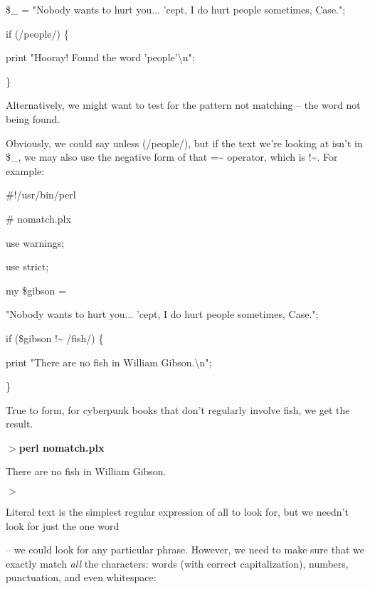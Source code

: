 \documentclass[a4paper,11pt]{book}
\begin{document}
\noindent 

\noindent \$\_  = "Nobody wants to hurt you... 'cept, I do hurt people sometimes, Case.";

\noindent if (/people/) \{

\noindent print "Hooray! Found the word 'people'\textbackslash n";

\noindent \}

\noindent 

\noindent Alternatively, we might want to test for the pattern not matching -- the word not being found.

\noindent Obviously, we could say unless (/people/), but if the text we're looking at isn't in \$\_, we may also use the negative form of that =\~{} operator, which is !\~{}. For example:

\noindent 

\noindent \#!/usr/bin/perl

\noindent \# nomatch.plx

\noindent use warnings;

\noindent use strict;

\noindent 

\noindent my \$gibson =

\noindent "Nobody wants to hurt you... 'cept, I do hurt people sometimes, Case.";

\noindent 

\noindent if (\$gibson !\~{} /fish/) \{

\noindent print "There are no fish in William Gibson.\textbackslash n";

\noindent \}

\noindent 

\noindent True to form, for cyberpunk books that don't regularly involve fish, we get the result.

\noindent 

\noindent $>$\textbf{perl nomatch.plx}

\noindent There are no fish in William Gibson.

\noindent $>$

\noindent 

\noindent Literal text is the simplest regular expression of all to look for, but we needn't look for just the one word

\noindent -- we could look for any particular phrase. However, we need to make sure that we exactly match \textit{all }the characters:  words (with correct capitalization), numbers, punctuation, and even whitespace:
\end{document}

